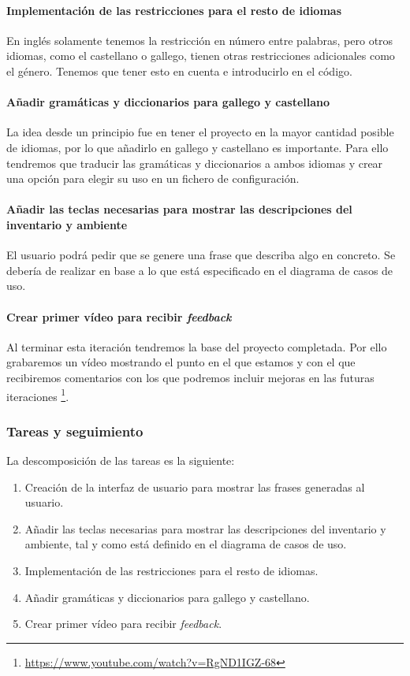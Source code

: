 \paragraph{Implementación de las restricciones para el resto de idiomas} En inglés solamente tenemos la restricción en número entre palabras, pero otros idiomas, como el castellano o gallego, tienen otras restricciones adicionales como el género. Tenemos que tener esto en cuenta e introducirlo en el código.

\paragraph{Añadir gramáticas y diccionarios para gallego y castellano} La idea desde un principio fue en tener el proyecto en la mayor cantidad posible de idiomas, por lo que añadirlo en gallego y castellano es importante. Para ello tendremos que traducir las gramáticas y diccionarios a ambos idiomas y crear una opción para elegir su uso en un fichero de configuración.

\paragraph{Añadir las teclas necesarias para mostrar las descripciones del inventario y ambiente} El usuario podrá pedir que se genere una frase que describa algo en concreto. Se debería de realizar en base a lo que está especificado en el diagrama de casos de uso.

\paragraph{Crear primer vídeo para recibir \textit{feedback}} Al terminar esta iteración tendremos la base del proyecto completada. Por ello grabaremos un vídeo mostrando el punto en el que estamos y con el que recibiremos comentarios con los que podremos incluir mejoras en las futuras iteraciones \footnote{\url{https://www.youtube.com/watch?v=RgND1IGZ-68}}.

\subsubsection{Tareas y seguimiento}

La descomposición de las tareas es la siguiente:

\begin{enumerate}[label=\bfseries WBS 6.\arabic*]
  \item Creación de la interfaz de usuario para mostrar las frases generadas al usuario.
  \item Añadir las teclas necesarias para mostrar las descripciones del inventario y ambiente, tal y como está definido en el diagrama de casos de uso.
  \item Implementación de las restricciones para el resto de idiomas.
  \item Añadir gramáticas y diccionarios para gallego y castellano.
  \item Crear primer vídeo para recibir \textit{feedback}.
\end{enumerate}

